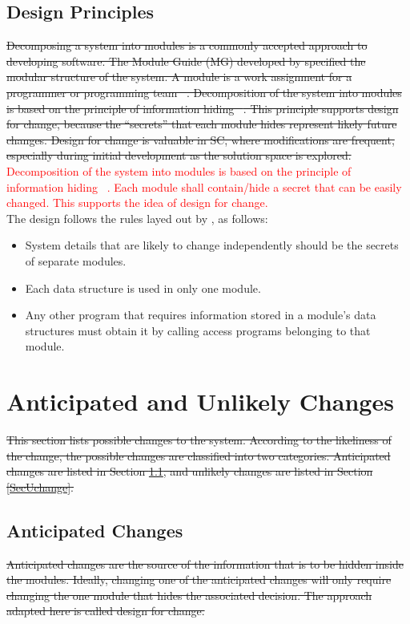 \documentclass[12pt, titlepage]{article}
\begin{document}
\subsection{Design Principles}
\sout{Decomposing a system into modules is a commonly accepted approach to developing software. The Module Guide (MG) developed by \mbox{\citep{ParnasEtAl1984}} specified the modular structure of the system. A module is a work assignment for a programmer or programming team \mbox{~\citep{ParnasEtAl1984}}. Decomposition of the system into modules is based on the principle of information hiding \mbox{~\citep{Parnas1972a}}. This principle supports design for change, because the ``secrets'' that each module hides represent likely future changes. Design for change is valuable in SC, where modifications are frequent, especially during initial development as the solution space is explored.}\\

\textcolor{red}{Decomposition of the system into modules is based on the principle of information hiding \mbox{~\citep{Parnas1972a}}. Each module shall contain/hide a secret that can be easily changed. This supports the idea of design for change.}\\

The design follows the rules layed out by \citet{ParnasEtAl1984}, as follows:
\begin{itemize}
\item System details that are likely to change independently should be the
  secrets of separate modules.
\item Each data structure is used in only one module.
\item Any other program that requires information stored in a module's data
  structures must obtain it by calling access programs belonging to that module.
\end{itemize}

\section{Anticipated and Unlikely Changes} \label{SecChange}

\sout{This section lists possible changes to the system. According to the likeliness of the change, the possible changes are classified into two categories. Anticipated changes are listed in Section \ref{SecAchange}, and unlikely changes are listed in Section \ref{SecUchange}.}

\subsection{Anticipated Changes} \label{SecAchange}
\sout{Anticipated changes are the source of the information that is to be hidden inside the modules. Ideally, changing one of the anticipated changes will only require changing the one module that hides the associated decision. The approach adapted here is called design for change.}
\end{document}

